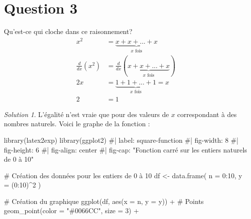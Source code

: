 \documentclass[
  12pt,
  letterpaper,
]{book}
\newenvironment{Shaded}{}{}
\newcommand{\AttributeTok}[1]{\textcolor[rgb]{0.84,0.23,0.29}{#1}}
\newcommand{\CommentTok}[1]{\textcolor[rgb]{0.42,0.45,0.49}{#1}}
\newcommand{\DecValTok}[1]{\textcolor[rgb]{0.00,0.36,0.77}{#1}}
\newcommand{\FunctionTok}[1]{\textcolor[rgb]{0.44,0.26,0.76}{#1}}
\newcommand{\NormalTok}[1]{\textcolor[rgb]{0.14,0.16,0.18}{#1}}
\newcommand{\OtherTok}[1]{\textcolor[rgb]{0.44,0.26,0.76}{#1}}
\newcommand{\SpecialCharTok}[1]{\textcolor[rgb]{0.00,0.36,0.77}{#1}}
\newcommand{\StringTok}[1]{\textcolor[rgb]{0.01,0.18,0.38}{#1}}
\theoremstyle{remark}
\newtheorem*{solution}{Solution}
\begin{document}
\hypertarget{question-3-1}{%
\section{Question 3}\label{question-3-1}}

Qu'est-ce qui cloche dans ce raisonnement? \begin{align}
x^2 &= \underbrace{x + x + ... + x}_{x \text{ fois}} \\
\frac{d}{dx}\left(x^2\right) &= \frac{d}{dx}\left(\underbrace{x + x + ... + x}_{x \text{ fois}}\right) \\
2x &= \underbrace{1 + 1 + ... + 1}_{x \text{ fois}} = x \\
2 &= 1
\end{align}

\begin{solution}

L'égalité n'est vraie que pour des valeurs de \(x\) correspondant à des
nombres naturels. Voici le graphe de la fonction :

\begin{Shaded}
\begin{Highlighting}[]
\FunctionTok{library}\NormalTok{(latex2exp)}
\FunctionTok{library}\NormalTok{(ggplot2)}
\CommentTok{\#| label: square{-}function}
\CommentTok{\#| fig{-}width: 8}
\CommentTok{\#| fig{-}height: 6}
\CommentTok{\#| fig{-}align: center}
\CommentTok{\#| fig{-}cap: "Fonction carré sur les entiers naturels de 0 à 10"}



\CommentTok{\# Création des données pour les entiers de 0 à 10}
\NormalTok{df }\OtherTok{\textless{}{-}} \FunctionTok{data.frame}\NormalTok{(}
  \AttributeTok{n =} \DecValTok{0}\SpecialCharTok{:}\DecValTok{10}\NormalTok{,}
  \AttributeTok{y =}\NormalTok{ (}\DecValTok{0}\SpecialCharTok{:}\DecValTok{10}\NormalTok{)}\SpecialCharTok{\^{}}\DecValTok{2}
\NormalTok{)}

\CommentTok{\# Création du graphique}
\FunctionTok{ggplot}\NormalTok{(df, }\FunctionTok{aes}\NormalTok{(}\AttributeTok{x =}\NormalTok{ n, }\AttributeTok{y =}\NormalTok{ y)) }\SpecialCharTok{+}
  \CommentTok{\# Points}
  \FunctionTok{geom\_point}\NormalTok{(}\AttributeTok{color =} \StringTok{"\#0066CC"}\NormalTok{, }\AttributeTok{size =} \DecValTok{3}\NormalTok{) }\SpecialCharTok{+}
  

\end{Highlighting}
\end{Shaded}
\end{solution}
\end{document}
